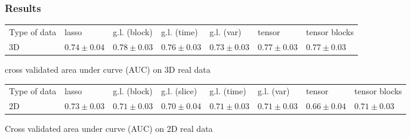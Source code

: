 \documentclass{beamer}
\begin{document}
\begin{frame}
    \frametitle{Results}
    \begin{table}[H]
        \centering
        \label{tab:result_real}
        \renewcommand{\arraystretch}{1.2} 
        \begin{adjustbox}{center}
        \begin{tabular}{|>{\centering\arraybackslash}m{1.4cm}|>{\centering\arraybackslash}m{1.1cm}|>{\centering\arraybackslash}m{1.1cm}|>{\centering\arraybackslash}m{1.1cm}|>{\centering\arraybackslash}m{1.1cm}|>{\centering\arraybackslash}m{1.1cm}|>{\centering\arraybackslash}m{1.1cm}|}
            \cline{1-7}
            Type of data & lasso & g.l. (block) & g.l. (time)& g.l. (var) & tensor & tensor blocks\\
            \cline{1-7} 
            3D & $0.74 \pm 0.04$& $0.78 \pm 0.03$ & $0.76 \pm 0.03$ & $0.73 \pm 0.03$ & $0.77 \pm 0.03$ & $0.77 \pm 0.03$ \\
            \cline{1-7}
    
        \end{tabular}
        
    \end{adjustbox}
    \parbox{0.9\textwidth}{
    \vspace{0.2 cm}    
    \centering \small cross validated area under curve (AUC) on 3D real data}
    \vspace{0.3 cm}
    
    \begin{adjustbox}{center}
    \begin{tabular}{|>{\centering\arraybackslash}m{1.2cm}|>{\centering\arraybackslash}m{1cm}|>{\centering\arraybackslash}m{1cm}|>{\centering\arraybackslash}m{1cm}|>{\centering\arraybackslash}m{1cm}|>{\centering\arraybackslash}m{1cm}|>{\centering\arraybackslash}m{1cm}|>{\centering\arraybackslash}m{1cm}|}
        \cline{1-8}
        Type of data & lasso & g.l. (block) & g.l. (slice)& g.l. (time)& g.l. (var) & tensor & tensor blocks\\
        \cline{1-8} 
        2D & $0.73 \pm 0.03$ & $0.71 \pm 0.03$ & $0.70 \pm 0.04$ & $0.71 \pm 0.03 $  & $0.71 \pm 0.03$ & $0.66 \pm 0.04$ & $0.71 \pm 0.03$ \\
        \cline{1-8}
    \end{tabular}
    \end{adjustbox}
    \parbox{0.9\textwidth}{
    \vspace{0.2 cm}    
    \centering \small Cross validated area under curve (AUC) on 2D real data}
    \end{table}
\end{frame}
\end{document}
